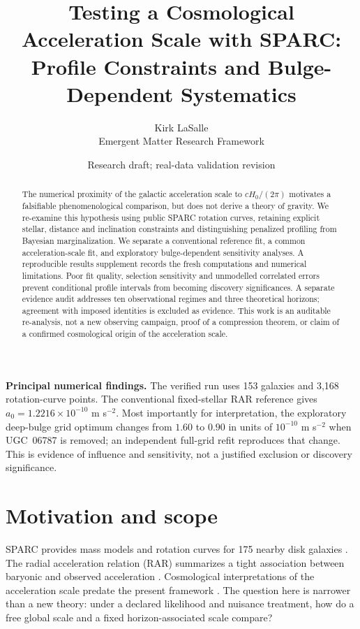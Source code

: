 \documentclass[11pt]{article}
\title{Testing a Cosmological Acceleration Scale with SPARC:\\Profile Constraints and Bulge-Dependent Systematics}
\author{Kirk LaSalle\\Emergent Matter Research Framework}
\date{Research draft; real-data validation revision}
\begin{document}
\maketitle
\begin{abstract}
The numerical proximity of the galactic acceleration scale to $cH_0/(2\pi)$ motivates a falsifiable phenomenological comparison, but does not derive a theory of gravity. We re-examine this hypothesis using public SPARC rotation curves, retaining explicit stellar, distance and inclination constraints and distinguishing penalized profiling from Bayesian marginalization. We separate a conventional reference fit, a common acceleration-scale fit, and exploratory bulge-dependent sensitivity analyses. A reproducible results supplement records the fresh computations and numerical limitations. Poor fit quality, selection sensitivity and unmodelled correlated errors prevent conditional profile intervals from becoming discovery significances. A separate evidence audit addresses ten observational regimes and three theoretical horizons; agreement with imposed identities is excluded as evidence. This work is an auditable re-analysis, not a new observing campaign, proof of a compression theorem, or claim of a confirmed cosmological origin of the acceleration scale.
\end{abstract}

\noindent\textbf{Principal numerical findings.}
The verified run uses 153 galaxies and 3,168 rotation-curve points.
The conventional fixed-stellar RAR reference gives
$a_0=1.2216\times10^{-10}$ m s$^{-2}$.
Most importantly for interpretation, the exploratory deep-bulge grid optimum
changes from $1.60$ to $0.90$ in units of $10^{-10}$ m s$^{-2}$ when UGC~06787 is removed;
an independent full-grid refit reproduces that change. This is evidence of
influence and sensitivity, not a justified exclusion or discovery significance.

\section{Motivation and scope}
SPARC provides mass models and rotation curves for 175 nearby disk galaxies \cite{lelli2016}. The radial acceleration relation (RAR) summarizes a tight association between baryonic and observed acceleration \cite{mcgaugh2016}. Cosmological interpretations of the acceleration scale predate the present framework \cite{milgrom1999}. The question here is narrower than a new theory: under a declared likelihood and nuisance treatment, how do a free global scale and a fixed horizon-associated scale compare?
\end{document}
